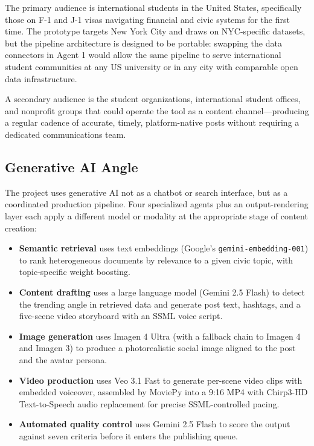 \documentclass[12pt, letterpaper]{article}
\begin{document}
The primary audience is international students in the United States, specifically those
on F-1 and J-1 visas navigating financial and civic systems for the first time. The
prototype targets New York City and draws on NYC-specific datasets, but the pipeline
architecture is designed to be portable: swapping the data connectors in Agent 1 would
allow the same pipeline to serve international student communities at any US university
or in any city with comparable open data infrastructure.

A secondary audience is the student organizations, international student offices, and
nonprofit groups that could operate the tool as a content channel---producing a regular
cadence of accurate, timely, platform-native posts without requiring a dedicated
communications team.

\subsection{Generative AI Angle}

The project uses generative AI not as a chatbot or search interface, but as a
coordinated production pipeline. Four specialized agents plus an output-rendering
layer each apply a different model or modality at the appropriate stage of content
creation:

\begin{itemize}[leftmargin=1.5em]
  \item \textbf{Semantic retrieval} uses text embeddings (Google's
    \texttt{gemini-embedding-001}) to rank heterogeneous documents by relevance to
    a given civic topic, with topic-specific weight boosting.
  \item \textbf{Content drafting} uses a large language model (Gemini 2.5 Flash) to
    detect the trending angle in retrieved data and generate post text, hashtags,
    and a five-scene video storyboard with an SSML voice script.
  \item \textbf{Image generation} uses Imagen 4 Ultra (with a fallback chain to
    Imagen 4 and Imagen 3) to produce a photorealistic social image aligned to the
    post and the avatar persona.
  \item \textbf{Video production} uses Veo 3.1 Fast to generate per-scene video
    clips with embedded voiceover, assembled by MoviePy into a 9:16 MP4 with
    Chirp3-HD Text-to-Speech audio replacement for precise SSML-controlled pacing.
  \item \textbf{Automated quality control} uses Gemini 2.5 Flash to score the
    output against seven criteria before it enters the publishing queue.
\end{itemize}
\end{document}
